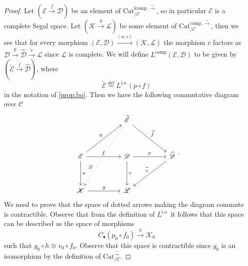 \documentclass[a4paper, reqno]{amsart}
\theoremstyle{definition}
\newcommand\cC{\mathscr C}
\newcommand\cD{\mathscr D}
\newcommand\cE{\mathscr E}
\newcommand\cK{\mathscr K}
\newcommand\cL{\mathscr L}
\newcommand\cat{\mathrm{Cat}}
\newcommand\comp{\mathrm{comp}}
\newcommand\lcomp{\mathrm{lcomp}}
\newcommand\bydef{\overset{\mathrm{def}}{=}}
\newcommand\bo{\mathrm{i.o.}}
\newcommand\wrr{{\overset{\sim}{\rightarrow}}}
\begin{document}
\begin{proof}
Let $(\cE\xrightarrow{f}\cD)$ be an element of $\cat^{\lcomp,\wrr}_{/\cC}$, so in particular $\cE$ is a complete Segal space. Let $(\cK\xrightarrow{g}\cL)$ be some element of $\cat^{\comp,\wrr}_{/\cC}$, then we see that for every morphism $(\cE,\cD)\xrightarrow{(u,v)}(\cK,\cL)$ the morphism $v$ factors as $\cD\xrightarrow{p}\widehat{\cD}\xrightarrow{\widetilde{v}}\cL$ since $\cL$ is complete. We will define $L^\comp(\cE,\cD)$ to be given by $(\widetilde{\cE}\xrightarrow{\widetilde{f}}\widehat{\cD})$, where 
\[\widetilde{\cE}\bydef L^\bo(p\circ f)\]
in the notation of \cref{prop:bo}. Then we have the following commutative diagram over $\cC$
\[
\begin{tikzcd}[row sep=huge, column sep=huge]
{}&\widetilde{\cE}\arrow[dr, "\widetilde{f}"]\arrow[ddl, dotted, near end, "\exists!" swap]\\
\cE\arrow[ur, "\eta"]\arrow[r, "f"]\arrow[d, "u"]&\cD\arrow[r, "p"]\arrow[d, "v"]&\widehat{\cD}\arrow[dl, "\widetilde{v}" swap]\\
\cK\arrow[r, "g"]&\cL
\end{tikzcd}.
\]
We need to prove that the space of dotted arrows making the diagram commute is contractible. Observe that from the definition of $L^\bo$ it follows that this space can be described as the space of morphisms 
\[C_\bullet(p_0\circ f_0)\xrightarrow{h}\cK_0\]
such that $g_0\circ h\cong v_0\circ f_0$. Observe that this space is contractible since $g_0$ is an isomorphism by the definition of $\cat^\wrr_{/\cC}$.
\end{proof}
\end{document}
